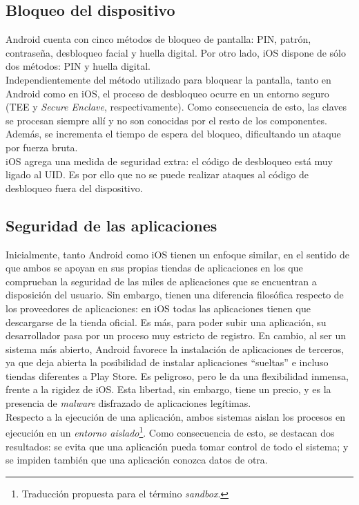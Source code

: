\subsection{Bloqueo del dispositivo}
Android cuenta con cinco métodos de bloqueo de pantalla: PIN, patrón, contraseña, desbloqueo facial y huella digital. Por otro lado, iOS dispone de sólo dos métodos: PIN y huella digital.\\

Independientemente del método utilizado para bloquear la pantalla, tanto en Android como en iOS, el proceso de desbloqueo ocurre en un entorno seguro (TEE y \emph{Secure Enclave}, respectivamente). Como consecuencia de esto, las claves se procesan siempre allí y no son conocidas por el resto de los componentes. Además, se incrementa el tiempo de espera del bloqueo, dificultando un ataque por fuerza bruta.\\

iOS agrega una medida de seguridad extra: el código de desbloqueo está muy ligado al UID. Es por ello que no se puede realizar ataques al código de desbloqueo fuera del dispositivo.
\subsection{Seguridad de las aplicaciones}
Inicialmente, tanto Android como iOS tienen un enfoque similar, en el sentido de que ambos se apoyan en sus propias tiendas de aplicaciones en los que comprueban la seguridad de las miles de aplicaciones que se encuentran a disposición del usuario. Sin embargo, tienen una diferencia filosófica respecto de los proveedores de aplicaciones: en iOS todas las aplicaciones tienen que descargarse de la tienda oficial. Es más, para poder subir una aplicación, su desarrollador pasa por un proceso muy estricto de registro. En cambio, al ser un sistema más abierto, Android favorece la instalación de aplicaciones de terceros, ya que deja abierta la posibilidad de instalar aplicaciones ``sueltas'' e incluso tiendas diferentes a Play Store. Es peligroso, pero le da una flexibilidad inmensa, frente a la rigidez de iOS. Esta libertad, sin embargo, tiene un precio, y es la presencia de \emph{malware} disfrazado de aplicaciones legítimas.\\

Respecto a la ejecución de una aplicación, ambos sistemas aislan los procesos en ejecución en un \emph{entorno aislado}\footnote{Traducción propuesta para el término \textit{sandbox}.}. Como consecuencia de esto, se destacan dos resultados: se evita que una aplicación pueda tomar control de todo el sistema; y se impiden también que una aplicación conozca datos de otra.\\


